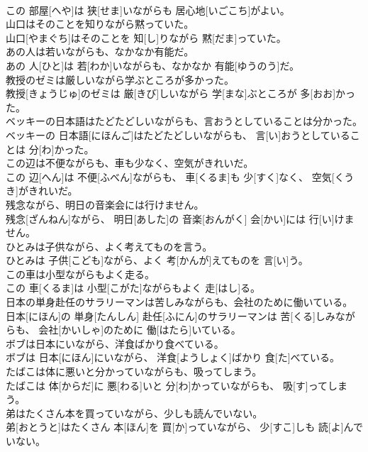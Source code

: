 \documentclass[8pt]{extreport}
\begin{document}
\begin{CJK}{UTF8}{min}
\\	この 部屋[へや]は 狭[せま]いながらも 居心地[いごこち]がよい。
\\	山口はそのことを知りながら黙っていた。	
\\	山口[やまぐち]はそのことを 知[し]りながら 黙[だま]っていた。
\\	あの人は若いながらも、なかなか有能だ。	
\\	あの 人[ひと]は 若[わか]いながらも、なかなか 有能[ゆうのう]だ。
\\	教授のゼミは厳しいながら学ぶところが多かった。	
\\	教授[きょうじゅ]のゼミは 厳[きび]しいながら 学[まな]ぶところが 多[おお]かった。
\\	ベッキーの日本語はたどたどしいながらも、言おうとしていることは分かった。	
\\	ベッキーの 日本語[にほんご]はたどたどしいながらも、 言[い]おうとしていることは 分[わ]かった。
\\	この辺は不便ながらも、車も少なく、空気がきれいだ。	
\\	この 辺[へん]は 不便[ふべん]ながらも、 車[くるま]も 少[すく]なく、 空気[くうき]がきれいだ。
\\	残念ながら、明日の音楽会には行けません。	
\\	残念[ざんねん]ながら、 明日[あした]の 音楽[おんがく] 会[かい]には 行[い]けません。
\\	ひとみは子供ながら、よく考えてものを言う。	
\\	ひとみは 子供[こども]ながら、よく 考[かんが]えてものを 言[い]う。
\\	この車は小型ながらもよく走る。	
\\	この 車[くるま]は 小型[こがた]ながらもよく 走[はし]る。
\\	日本の単身赴任のサラリーマンは苦しみながらも、会社のために働いている。	
\\	日本[にほん]の 単身[たんしん] 赴任[ふにん]のサラリーマンは 苦[くる]しみながらも、 会社[かいしゃ]のために 働[はたら]いている。
\\	ボブは日本にいながら、洋食ばかり食べている。	
\\	ボブは 日本[にほん]にいながら、 洋食[ようしょく]ばかり 食[た]べている。
\\	たばこは体に悪いと分かっていながらも、吸ってしまう。	
\\	たばこは 体[からだ]に 悪[わる]いと 分[わ]かっていながらも、 吸[す]ってしまう。
\\	弟はたくさん本を買っていながら、少しも読んでいない。	
\\	弟[おとうと]はたくさん 本[ほん]を 買[か]っていながら、 少[すこ]しも 読[よ]んでいない。

\end{CJK}
\end{document}
